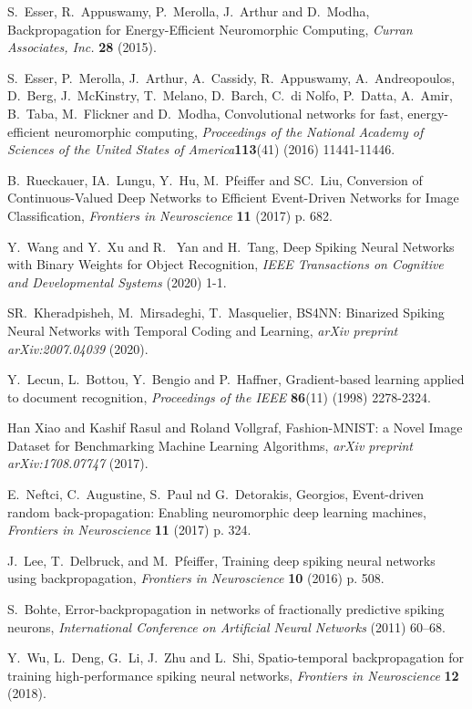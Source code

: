 \documentclass[preprint,twocolumn,5p,12pt]{article}
\begin{document}
\begin{singlespace}
\begin{thebibliography}{10}
S.~Esser, R.~Appuswamy, P.~Merolla, J.~Arthur and D.~Modha, Backpropagation for Energy-Efficient Neuromorphic Computing, {\em Curran Associates, Inc.} {\bf 28}  (2015).

S.~Esser, P.~Merolla, J.~Arthur, A.~Cassidy, R.~Appuswamy, A.~Andreopoulos, D.~Berg, J.~McKinstry, T.~Melano, D.~Barch, C.~di Nolfo, P.~Datta, A.~Amir, B.~Taba, M.~Flickner and D.~Modha, Convolutional networks for fast, energy-efficient neuromorphic computing, {\em Proceedings of the National Academy of Sciences of the United States of America}{\bf 113}(41)   (2016)  11441-11446.

B.~Rueckauer, IA.~Lungu, Y.~Hu, M.~Pfeiffer and SC.~Liu, Conversion of Continuous-Valued Deep Networks to Efficient Event-Driven Networks for Image Classification, {\em Frontiers in Neuroscience} {\bf 11} (2017)  p. 682.

Y.~Wang and Y.~Xu and R. ~Yan and H.~Tang, Deep Spiking Neural Networks with Binary Weights for Object Recognition, {\em
  IEEE Transactions on Cognitive and Developmental Systems}  (2020)  1-1.

SR.~Kheradpisheh, M.~Mirsadeghi, T.~Masquelier, BS4NN: Binarized Spiking Neural Networks with Temporal Coding and Learning, {\em arXiv preprint arXiv:2007.04039}  (2020).

Y.~Lecun, L.~Bottou, Y.~Bengio and P.~Haffner, Gradient-based learning applied to document recognition,
  {\em Proceedings of the IEEE} {\bf 86}(11)   (1998)  2278-2324.

Han Xiao and Kashif Rasul and Roland Vollgraf, Fashion-MNIST: a Novel Image Dataset for Benchmarking Machine Learning Algorithms, {\em arXiv preprint arXiv:1708.07747} (2017).

E.~Neftci, C.~Augustine, S.~Paul nd G.~Detorakis, Georgios, Event-driven random back-propagation: Enabling neuromorphic deep learning machines, {\em Frontiers in Neuroscience} {\bf 11}  (2017)  p. 324.

J.~Lee, T.~Delbruck, and M.~Pfeiffer, Training deep spiking neural networks using backpropagation, {\em Frontiers in Neuroscience} {\bf 10}  (2016) p. 508.

S.~Bohte, Error-backpropagation in networks of fractionally predictive spiking neurons, {\em International Conference on Artificial Neural Networks}  (2011)  60--68.

Y.~Wu, L.~Deng, G.~Li, J.~Zhu and L.~Shi, Spatio-temporal backpropagation for training high-performance spiking neural networks, {\em Frontiers in Neuroscience} {\bf 12}  (2018).


\end{thebibliography}
\end{singlespace}
\end{document}
